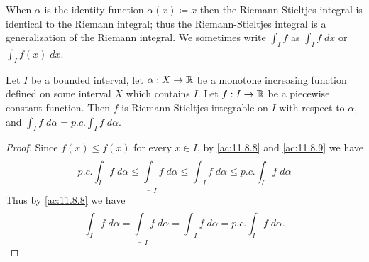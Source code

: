 \begin{note}
  When \(\alpha\) is the identity function \(\alpha(x) \coloneqq x\) then the Riemann-Stieltjes integral is identical to the Riemann integral;
  thus the Riemann-Stieltjes integral is a generalization of the Riemann integral.
  We sometimes write \(\int_I f\) as \(\int_I f \; dx\) or \(\int_I f(x) \; dx\).
\end{note}

\begin{ac}\label{ac:11.8.10}
  Let \(I\) be a bounded interval, let \(\alpha : X \to \mathbb{R}\) be a monotone increasing function defined on some interval \(X\) which contains \(I\).
  Let \(f : I \to \mathbb{R}\) be a piecewise constant function.
  Then \(f\) is Riemann-Stieltjes integrable on \(I\) with respect to \(\alpha\), and \(\int_I f \; d \alpha = p.c. \int_I f \; d \alpha\).
\end{ac}

\begin{proof}
  Since \(f(x) \leq f(x)\) for every \(x \in I\), by \cref{ac:11.8.8} and \cref{ac:11.8.9} we have
  \[
    p.c. \int_I f \; d \alpha \leq \underline{\int}_I f \; d \alpha \leq \overline{\int}_I f \; d \alpha \leq p.c. \int_I f \; d \alpha
  \]
  Thus by \cref{ac:11.8.8} we have
  \[
    \int_I f \; d \alpha = \underline{\int}_I f \; d \alpha = \overline{\int}_I f \; d \alpha = p.c. \int_I f \; d \alpha.
  \]
\end{proof}

